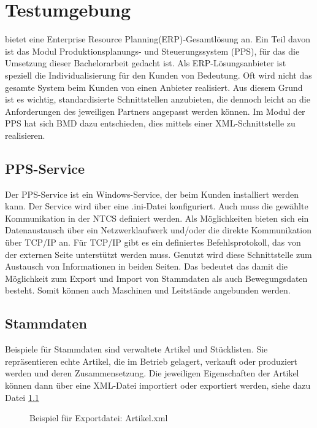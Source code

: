 \chapter{Testumgebung}
\label{cha:Testumgebung}

\BMD bietet eine Enterprise Resource Planning(ERP)-Gesamtlösung an. Ein Teil davon ist das Modul Produktionsplanungs- und Steuerungssystem (PPS), für das die Umsetzung dieser Bachelorarbeit gedacht ist.
Als ERP-Lösungsanbieter ist speziell die Individualisierung für den Kunden von Bedeutung. Oft wird nicht das gesamte System beim Kunden von einen Anbieter realisiert. Aus diesem Grund ist es wichtig, standardisierte Schnittstellen anzubieten, die dennoch leicht an die Anforderungen des jeweiligen Partners angepasst werden können. Im Modul der PPS hat sich BMD dazu entschieden, dies mittels einer XML-Schnittstelle zu realisieren.



\section{PPS-Service}
Der PPS-Service  ist ein Windows-Service, der beim Kunden installiert werden kann. Der Service wird über eine .ini-Datei konfiguriert. Auch muss die gewählte Kommunikation in der NTCS definiert werden. Als Möglichkeiten bieten sich ein Datenaustausch über ein Netzwerklaufwerk und/oder die direkte Kommunikation über TCP/IP an. Für TCP/IP gibt es ein definiertes Befehlsprotokoll, das von der externen Seite unterstützt werden muss.
Genutzt wird diese Schnittstelle zum Austausch von Informationen in beiden Seiten. Das bedeutet das damit die Möglichkeit zum Export und Import von Stammdaten als auch Bewegungsdaten besteht. Somit können auch Maschinen und Leitstände angebunden werden. 

\section{Stammdaten}
Beispiele für Stammdaten sind verwaltete Artikel und Stücklisten. Sie repräsentieren echte Artikel, die im Betrieb gelagert, verkauft oder produziert werden und deren Zusammensetzung. Die jeweiligen Eigenschaften der Artikel können dann über eine XML-Datei importiert oder exportiert werden, siehe dazu Datei \ref{fig:ArtikelExp}

\begin{figure}
\centering
{}
    
\caption{Beispiel für Exportdatei: Artikel.xml  %
}
\label{fig:ArtikelExp}
\end{figure}


